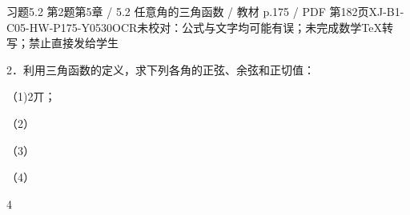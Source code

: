 \begin{bankitem}{习题5.2 第2题}{第5章 / 5.2 任意角的三角函数 / 教材 p.175 / PDF 第182页}{XJ-B1-C05-HW-P175-Y0530}{OCR未校对：公式与文字均可能有误；未完成数学TeX转写；禁止直接发给学生}
\begin{ocrdraft}
\par
2．利用三角函数的定义，求下列各角的正弦、余弦和正切值：
\par
（1)2丌；
\par
（2）
\par
（3）
\par
（4）
\par
4
\end{ocrdraft}
\end{bankitem}
